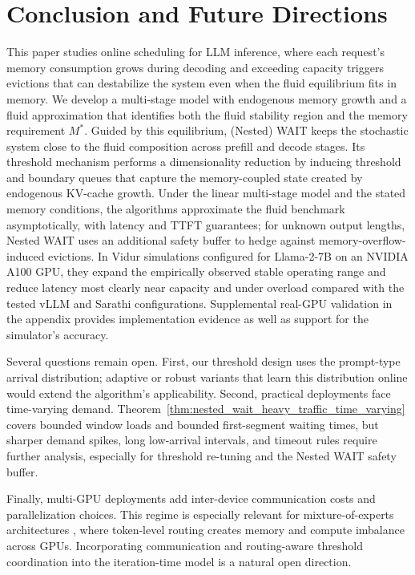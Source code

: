 \section{Conclusion and Future Directions}

This paper studies online scheduling for LLM inference, where each request's memory consumption grows during decoding and exceeding capacity triggers evictions that can destabilize the system even when the fluid equilibrium fits in memory. We develop a multi-stage model with endogenous memory growth and a fluid approximation that identifies both the fluid stability region and the memory requirement \(M^*\). Guided by this equilibrium, (Nested) WAIT keeps the stochastic system close to the fluid composition across prefill and decode stages. Its threshold mechanism performs a dimensionality reduction by inducing threshold and boundary queues that capture the memory-coupled state created by endogenous KV-cache growth. Under the linear multi-stage model and the stated memory conditions, the algorithms approximate the fluid benchmark asymptotically, with latency and TTFT guarantees; for unknown output lengths, Nested WAIT uses an additional safety buffer to hedge against memory-overflow-induced evictions. In Vidur simulations configured for Llama-2-7B on an NVIDIA A100 GPU, they expand the empirically observed stable operating range and reduce latency most clearly near capacity and under overload compared with the tested vLLM and Sarathi configurations. Supplemental real-GPU validation in the appendix provides implementation evidence as well as support for the simulator's accuracy.

Several questions remain open. First, our threshold design uses the prompt-type arrival distribution; adaptive or robust variants that learn this distribution online would extend the algorithm's applicability. Second, practical deployments face time-varying demand. Theorem~\ref{thm:nested_wait_heavy_traffic_time_varying} covers bounded window loads and bounded first-segment waiting times, but sharper demand spikes, long low-arrival intervals, and timeout rules require further analysis, especially for threshold re-tuning and the Nested WAIT safety buffer.

Finally, multi-GPU deployments add inter-device communication costs and parallelization choices. This regime is especially relevant for mixture-of-experts architectures \citep{shazeer2017outrageously, fedus2022switch, jiang2024mixtral}, where token-level routing creates memory and compute imbalance across GPUs. Incorporating communication and routing-aware threshold coordination into the iteration-time model is a natural open direction.

